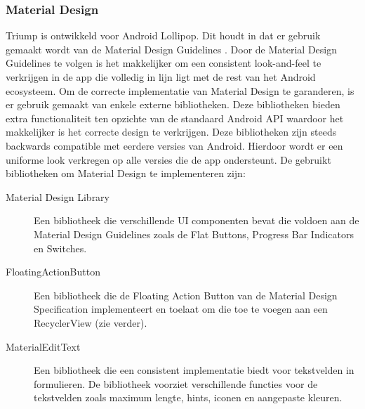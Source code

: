 \subsubsection{Material Design}
Triump is ontwikkeld voor Android Lollipop. Dit houdt in dat er gebruik gemaakt wordt van de Material Design Guidelines \cite{Material_Design}. Door de Material Design Guidelines te volgen is het makkelijker om een consistent look-and-feel te verkrijgen in de app die volledig in lijn ligt met de rest van het Android ecosysteem.
Om de correcte implementatie van Material Design te garanderen, is er gebruik gemaakt van enkele externe bibliotheken. Deze bibliotheken bieden extra functionaliteit ten opzichte van de standaard Android API waardoor het makkelijker is het correcte design te verkrijgen. Deze bibliotheken zijn steeds backwards compatible met eerdere versies van Android. Hierdoor wordt er een uniforme look verkregen op alle versies die de app ondersteunt.
De gebruikt bibliotheken om Material Design te implementeren zijn:
\begin{description}
	\item[Material Design Library \cite{navasmdc}] Een bibliotheek die verschillende UI componenten bevat die voldoen aan de Material Design Guidelines zoals de Flat Buttons, Progress Bar Indicators en Switches.
	\item[FloatingActionButton \cite{floatingactionbutton}] Een bibliotheek die de Floating Action Button van de Material Design Specification implementeert en toelaat om die toe te voegen aan een RecyclerView (zie verder).
	\item[MaterialEditText \cite{materialedittext}] Een bibliotheek die een consistent implementatie biedt voor tekstvelden in formulieren. De bibliotheek voorziet verschillende functies voor de tekstvelden zoals maximum lengte, hints, iconen en aangepaste kleuren.
\end{description}

